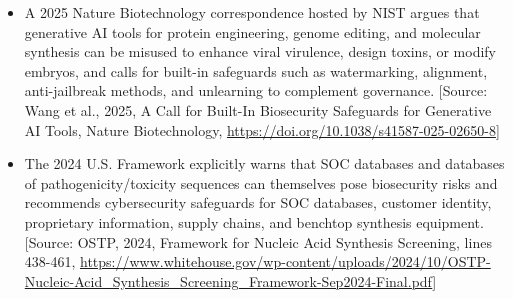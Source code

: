 \documentclass[11pt]{report}
\begin{document}
\begin{itemize}
\item A 2025 Nature Biotechnology correspondence hosted by NIST argues that generative AI tools for protein engineering, genome editing, and molecular synthesis can be misused to enhance viral virulence, design toxins, or modify embryos, and calls for built-in safeguards such as watermarking, alignment, anti-jailbreak methods, and unlearning to complement governance. [Source: Wang et al., 2025, A Call for Built-In Biosecurity Safeguards for Generative AI Tools, Nature Biotechnology, \url{https://doi.org/10.1038/s41587-025-02650-8}]
\item The 2024 U.S. Framework explicitly warns that SOC databases and databases of pathogenicity/toxicity sequences can themselves pose biosecurity risks and recommends cybersecurity safeguards for SOC databases, customer identity, proprietary information, supply chains, and benchtop synthesis equipment. [Source: OSTP, 2024, Framework for Nucleic Acid Synthesis Screening, lines 438-461, \url{https://www.whitehouse.gov/wp-content/uploads/2024/10/OSTP-Nucleic-Acid_Synthesis_Screening_Framework-Sep2024-Final.pdf}]
\end{itemize}
\end{document}
